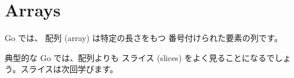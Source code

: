 \section{Arrays}


Go では、 配列 (array) は特定の長さをもつ 番号付けられた要素の列です。




典型的な Go では、配列よりも スライス (slices) をよく見ることになるでしょう。スライスは次回学びます。